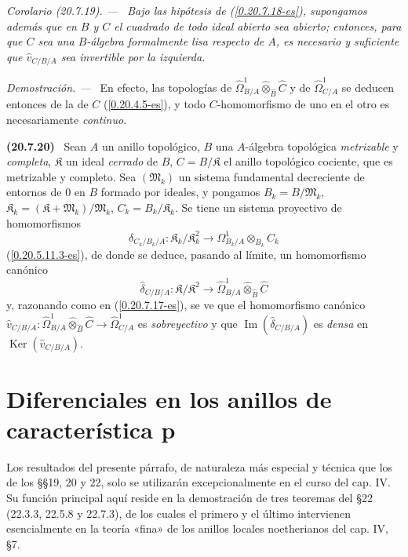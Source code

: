 \documentclass[10pt,oneside]{book}
\makeatletter
\newcommand{\sref}[1]{\textup{(\ref{#1})}}
\newcommand{\setmanualcurrentlabel}[1]{\def\@currentlabel{#1}}
\newcommand{\oldpage}[2][]{%
  \setcounter{footnote}{0}%
  \marginpar{\scriptsize\textbf{#1}~|~#2}\ignorespaces}
\newenvironment{env}[1][]{\setmanualcurrentlabel{#1}\par\medskip\noindent\textbf{(#1)}\ }{\par}
\newenvironment{corollary}[1][]{%
  \setmanualcurrentlabel{#1}\par\medskip\noindent\itshape Corolario (#1). ---\ }{\par}
\newenvironment{proof}{%
  \par\medskip\noindent\textit{Demostración. ---\ }}{\par}
\makeatother
\begin{document}
\begin{corollary}[20.7.19]
\label{0.20.7.19-es}
Bajo las hipótesis de \sref{0.20.7.18-es}, supongamos además que en $B$ y
$C$ el cuadrado de todo ideal abierto sea abierto; entonces, para que $C$ sea
una $B$-álgebra formalmente lisa respecto de $A$, es necesario y suficiente
que $\widehat v_{C/B/A}$ sea invertible por la izquierda.
\end{corollary}

\begin{proof}
En efecto, las topologías de
$\widehat{\Omega}^1_{B/A}\widehat\otimes_{\widehat B}\widehat C$ y de
$\widehat{\Omega}^1_{C/A}$ se deducen entonces de la de $C$
\sref{0.20.4.5-es}, y todo $C$-homomorfismo de uno en el otro es
necesariamente \emph{continuo}.
\end{proof}

\begin{env}[20.7.20]
\label{0.20.7.20-es}
Sean $A$ un anillo topológico, $B$ una $A$-álgebra topológica
\emph{metrizable} y \emph{completa}, $\mathfrak K$ un ideal \emph{cerrado} de $B$,
$C=B/\mathfrak K$ el anillo topológico cociente, que es metrizable y
completo. Sea $(\mathfrak{M}_k)$ un sistema fundamental decreciente de
entornos de $0$ en $B$ formado por ideales, y pongamos
$B_k=B/\mathfrak{M}_k$,
$\mathfrak K_k=(\mathfrak K+\mathfrak{M}_k)/\mathfrak{M}_k$,
$C_k=B_k/\mathfrak K_k$. Se tiene un sistema proyectivo de homomorfismos
\[
  \delta_{C_k/B_k/A}:\mathfrak K_k/\mathfrak K_k^2\to
  \Omega^1_{B_k/A}\otimes_{B_k}C_k
\]
\sref{0.20.5.11.3-es}, de donde se deduce, pasando al límite, un
homomorfismo canónico
\[
  \widehat\delta_{C/B/A}:\mathfrak K/\mathfrak K^2\to
  \widehat{\Omega}^1_{B/A}\widehat\otimes_{\widehat B}\widehat C
\]
y, razonando como en \sref{0.20.7.17-es}, se ve que el homomorfismo canónico
$\widehat v_{C/B/A}:\widehat{\Omega}^1_{B/A}
\widehat\otimes_{\widehat B}\widehat C\to\widehat{\Omega}^1_{C/A}$ es
\emph{sobreyectivo} y que $\operatorname{Im}(\widehat\delta_{C/B/A})$ es
\emph{densa} en $\operatorname{Ker}(\widehat v_{C/B/A})$.
\end{env}

\section{Diferenciales en los anillos de característica p}
Los resultados del presente párrafo, de naturaleza más especial y técnica que
los de los §§19, 20 y 22, solo se utilizarán excepcionalmente en el curso del
cap. IV. Su función principal aquí reside en la demostración de tres teoremas del §22
(22.3.3, 22.5.8 y 22.7.3), de los cuales el primero y el último intervienen
esencialmente en la teoría «fina» de los anillos locales noetherianos del
cap. IV, §7.
\oldpage[0\textsubscript{IV-1}]{154}
\end{document}
